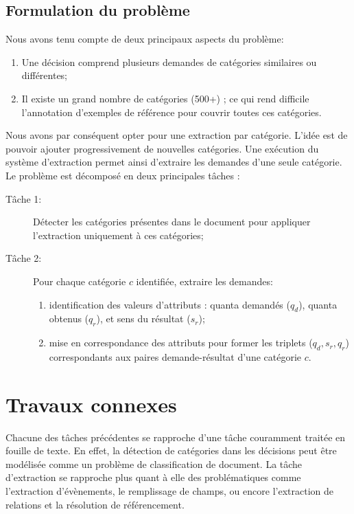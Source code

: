 

\subsection{Formulation du problème}
\label{sec:quanta:formulation}

Nous avons tenu compte de deux principaux aspects du problème:
\begin{enumerate}
	\item Une décision comprend plusieurs demandes de catégories similaires ou différentes;
	\item  Il existe un grand nombre de catégories (500+) ; ce qui rend difficile l'annotation d'exemples de référence pour couvrir toutes ces catégories.
\end{enumerate}

Nous avons par conséquent opter pour une extraction par catégorie. L'idée est de pouvoir ajouter progressivement de nouvelles catégories. Une exécution du système d'extraction permet ainsi d'extraire les demandes d'une seule catégorie. Le problème est décomposé en deux principales tâches :
\begin{description}
	\item[Tâche 1:] Détecter les catégories présentes dans le document pour appliquer l'extraction  uniquement à ces catégories;
	\item[Tâche 2:] Pour chaque catégorie $c$ identifiée, extraire les demandes:
	\begin{enumerate}
		\item identification des valeurs d'attributs : quanta demandés ($q_d$), quanta obtenus ($q_r$), et sens du résultat ($s_r$);
		\item mise en correspondance des attributs pour former les triplets ($q_d, s_r, q_r$) correspondants aux paires demande-résultat d'une catégorie $c$.
	\end{enumerate}
\end{description}

 
\section{Travaux connexes}
\label{sec:quanta:biblio}
Chacune des tâches précédentes se rapproche d'une tâche couramment traitée en fouille de texte. En effet, la détection de catégories dans les décisions peut être modélisée comme un problème de classification de document. La tâche d'extraction se rapproche plus quant à elle des problématiques comme l'extraction d'évènements, le remplissage de champs, ou encore l'extraction de relations et la résolution de référencement.

